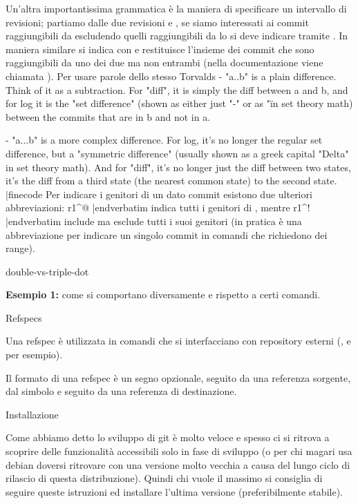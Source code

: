 Un'altra importantissima grammatica \`e la maniera di specificare un intervallo
di revisioni; partiamo dalle due revisioni  e , se siamo
interessati ai commit raggiungibili da  escludendo quelli
raggiungibili da  lo si deve indicare tramite . In maniera
similare si indica con  e restituisce l'insieme dei commit che
sono raggiungibili da uno dei due ma non entrambi (nella documentazione viene
chiamata ).
Per usare parole dello stesso Torvalds
\smallskip
\noindent{}
\iniziacode
 - "a..b" is a plain difference. Think of it as a subtraction. For "diff", 
   it is simply the diff between a and b, and for log it is the "set 
   difference" (shown as either just "-" or as "\" in set theory math) 
   between the commits that are in b and not in a.

 - "a...b" is a more complex difference. For log, it's no longer the 
   regular set difference, but a "symmetric difference" (usually shown as 
   a greek capital "Delta" in set theory math). And for "diff", it's no 
   longer just the diff between two states, it's the diff from a third 
   state (the nearest common state) to the second state.
|finecode
Per indicare i genitori di un dato commit esistono due ulteriori abbreviazioni:
\verbatim r1^@ |endverbatim indica tutti i genitori di , mentre
\verbatim r1^! |endverbatim include
 ma esclude tutti i suoi genitori (in pratica \`e una abbreviazione per
indicare un singolo commit in comandi che richiedono dei range). 

\lonelypage double-vs-triple-dot

{\bf Esempio 1:} come si comportano diversamente  e
	 rispetto a certi comandi.

\sezione Refspecs

Una refspec \`e utilizzata in comandi che si interfacciano con repository
esterni (,  e  per esempio).

Il formato di una refspec \`e un segno \code{+} opzionale, seguito da una
referenza sorgente, dal simbolo \code{:} e seguito da una referenza di
destinazione.

\sezione Installazione

Come abbiamo detto lo sviluppo di git \`e molto veloce e spesso ci si ritrova a
scoprire delle funzionalit\`a accessibili solo in fase di sviluppo
(o per chi magari
usa debian doversi ritrovare con una versione molto vecchia a causa del lungo
ciclo di rilascio di questa distribuzione). Quindi chi vuole il massimo si
consiglia di seguire queste istruzioni ed installare l'ultima versione
(preferibilmente stabile).

